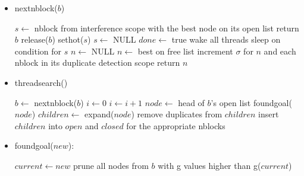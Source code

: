 \documentclass{article}
\begin{document}
\begin{itemize}
  \item nextnblock($b$)
  \begin{algorithmic}[1]
    \STATE $s \leftarrow$ nblock from interference scope with the best node on its open list
      \STATE return $b$
    \ENDIF
    \STATE release($b$)
      \STATE sethot($s$)
    \ELSE
      \STATE $s \leftarrow$ NULL
    \ENDIF
  \ENDIF
    \STATE $done \leftarrow$ true
    \STATE wake all threads
  \ENDIF
    \STATE sleep on condition for $s$
  \ENDWHILE
    \STATE $n \leftarrow$ NULL
  \ELSE
    \STATE $n \leftarrow$ best on free list
    \STATE increment $\sigma$ for $n$ and each nblock in its duplicate detection scope
  \ENDIF
  \STATE return $n$
  \end{algorithmic}

  \item threadsearch()
  \begin{algorithmic}[1]
    \STATE $b \leftarrow$ nextnblock($b$)
      \STATE $i \leftarrow 0$
    \ENDIF
      \STATE $i \leftarrow i+1$
      \STATE $node \leftarrow$ head of $b$'s open list
        \STATE foundgoal($node$)
        \STATE $children \leftarrow$ expand($node$)
        \STATE remove duplicates from $children$
        \STATE insert $children$ into $open$ and $closed$ for the appropriate nblocks
      \ENDIF
    \ENDWHILE
  \ENDWHILE
  \end{algorithmic}

  \item foundgoal($new$):
  \begin{algorithmic}[1]
        \STATE $current \leftarrow new$
        \STATE prune all nodes from $b$ with g values higher than g($current$)
      \ENDIF
  \end{algorithmic}
\end{itemize}
\end{document}
